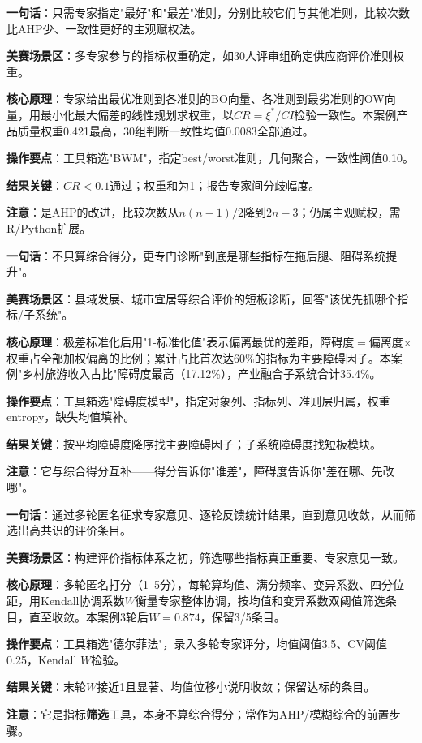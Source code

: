 
\begin{algobrief}
\textbf{一句话}：只需专家指定"最好"和"最差"准则，分别比较它们与其他准则，比较次数比AHP少、一致性更好的主观赋权法。

\textbf{美赛场景区}：多专家参与的指标权重确定，如30人评审组确定供应商评价准则权重。

\textbf{核心原理}：专家给出最优准则到各准则的BO向量、各准则到最劣准则的OW向量，用最小化最大偏差的线性规划求权重，以$CR=\xi^*/CI$检验一致性。本案例产品质量权重0.421最高，30组判断一致性均值0.0083全部通过。

\textbf{操作要点}：工具箱选"BWM"，指定best/worst准则，几何聚合，一致性阈值0.10。

\textbf{结果关键}：$CR<0.1$通过；权重和为1；报告专家间分歧幅度。

\textbf{注意}：是AHP的改进，比较次数从$n(n-1)/2$降到$2n-3$；仍属主观赋权，需R/Python扩展。
\end{algobrief}


\begin{algobrief}
\textbf{一句话}：不只算综合得分，更专门诊断"到底是哪些指标在拖后腿、阻碍系统提升"。

\textbf{美赛场景区}：县域发展、城市宜居等综合评价的短板诊断，回答"该优先抓哪个指标/子系统"。

\textbf{核心原理}：极差标准化后用"1-标准化值"表示偏离最优的差距，障碍度$=$偏离度$\times$权重占全部加权偏离的比例；累计占比首次达60\%的指标为主要障碍因子。本案例"乡村旅游收入占比"障碍度最高（17.12\%），产业融合子系统合计35.4\%。

\textbf{操作要点}：工具箱选"障碍度模型"，指定对象列、指标列、准则层归属，权重entropy，缺失均值填补。

\textbf{结果关键}：按平均障碍度降序找主要障碍因子；子系统障碍度找短板模块。

\textbf{注意}：它与综合得分互补——得分告诉你"谁差"，障碍度告诉你"差在哪、先改哪"。
\end{algobrief}


\begin{algobrief}
\textbf{一句话}：通过多轮匿名征求专家意见、逐轮反馈统计结果，直到意见收敛，从而筛选出高共识的评价条目。

\textbf{美赛场景区}：构建评价指标体系之初，筛选哪些指标真正重要、专家意见一致。

\textbf{核心原理}：多轮匿名打分（1--5分），每轮算均值、满分频率、变异系数、四分位距，用Kendall协调系数$W$衡量专家整体协调，按均值和变异系数双阈值筛选条目，直至收敛。本案例3轮后$W=0.874$，保留3/5条目。

\textbf{操作要点}：工具箱选"德尔菲法"，录入多轮专家评分，均值阈值3.5、CV阈值0.25，Kendall $W$检验。

\textbf{结果关键}：末轮$W$接近1且显著、均值位移小说明收敛；保留达标的条目。

\textbf{注意}：它是指标\textbf{筛选}工具，本身不算综合得分；常作为AHP/模糊综合的前置步骤。
\end{algobrief}


